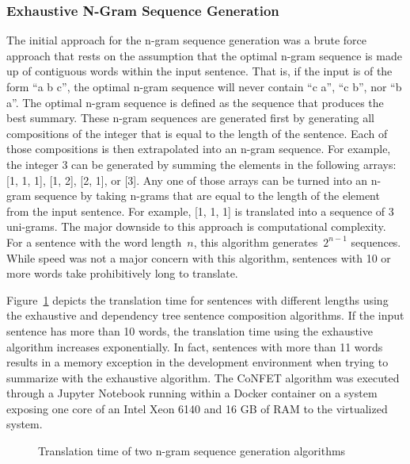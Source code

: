 \documentclass{article}[10]
\begin{document}
\subsubsection{Exhaustive N-Gram Sequence Generation\label{sec:exhaustive}}

The initial approach for the n-gram sequence generation was a brute
force approach that rests on the assumption that the optimal n-gram
sequence is made up of contiguous words within the input sentence. That
is, if the input is of the form ``a b c'', the optimal n-gram sequence
will never contain ``c a'', ``c b'', nor ``b a''. The optimal n-gram
sequence is defined as the sequence that produces the best summary.
These n-gram sequences are generated first by generating all
compositions of the integer that is equal to the length of the sentence.
Each of those compositions is then extrapolated into an n-gram sequence.
For example, the integer 3 can be generated by summing the elements in
the following arrays: [1, 1, 1], [1, 2], [2, 1], or [3].
Any one of those arrays can be turned into an n-gram sequence by taking
n-grams that are equal to the length of the element from the input
sentence. For example, [1, 1, 1] is translated into a sequence of 3
uni-grams. The major downside to this approach is computational
complexity. For a sentence with the word length~\(n\), this
algorithm generates~\(2^{n-1}\) sequences. While speed was not a
major concern with this algorithm, sentences with 10 or more words take
prohibitively long to translate.

Figure~\ref{fig:timing} depicts the translation time
for sentences with different lengths using the exhaustive and dependency
tree sentence composition algorithms. If the input sentence has more
than 10 words, the translation time using the exhaustive algorithm
increases exponentially. In fact, sentences with more than 11 words
results in a memory exception in the development environment when
trying to summarize with the exhaustive algorithm. The CoNFET algorithm was executed through a Jupyter Notebook running within a Docker container on a system exposing one core of an Intel Xeon 6140 and 16 GB of RAM to the virtualized system.


\begin{figure}[h]
  \begin{center}
    \scalebox{0.6}{}
    \caption{Translation time of two n-gram sequence generation
      algorithms\label{fig:timing}}
  \end{center}
\end{figure}
\end{document}
